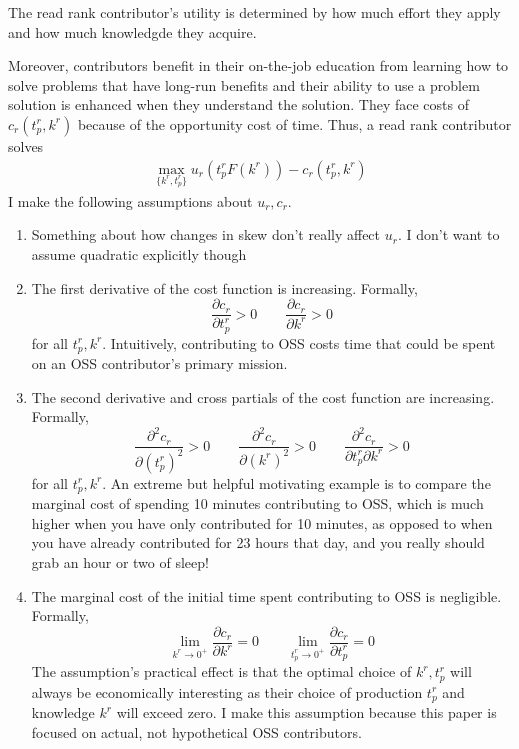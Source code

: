 \documentclass[source/paper/main.tex]{subfiles}
\begin{document}
\qquad The read rank contributor's utility is determined by how much effort they apply and how much knowledgde they acquire. 

Moreover, contributors benefit in their on-the-job education from learning how to solve problems that have long-run benefits and their ability to use a problem solution is enhanced when they understand the solution. They face costs of $c_r(t_p^r, k^r)$ because of the opportunity cost of time. Thus, a read rank contributor solves 
\begin{align}
    \max_{\{k^r, t_p^r\}} u_r\left( t_p^rF(k^r)  \right) - c_r(t_p^r, k^r) \label{read_rank_problem}
\end{align}
I make the following assumptions about $u_r, c_r$. 
\begin{enumerate}
    \item Something about how changes in skew don't really affect $u_r$. I don't want to assume quadratic explicitly though

    
    \item The first derivative of the cost function is increasing. Formally, 
    $$\frac{\partial c_r}{\partial t_p^r}>0 \qquad \frac{\partial c_r}{\partial k^r}>0$$
    for all $t_p^r, k^r$. Intuitively, contributing to OSS costs time that could be spent on an OSS contributor's primary mission. 
    \item The second derivative and cross partials of the cost function are increasing. Formally, $$\frac{\partial^2 c_r}{\partial (t_p^r)^2}>0 \qquad \frac{\partial^2 c_r}{\partial (k^r)^2}>0 \qquad \frac{\partial^2 c_r}{\partial t_p^r \partial k^r}>0$$
    for all $t_p^r, k^r$. An extreme but helpful motivating example is to compare the marginal cost of spending 10 minutes contributing to OSS, which is much higher when you have only contributed for 10 minutes, as opposed to when you have already contributed for 23 hours that day, and you really should grab an hour or two of sleep! 
    \item The marginal cost of the initial time spent contributing to OSS is negligible. Formally, $$\lim_{k^r \to 0^+} \frac{\partial c_r}{\partial k^r} = 0 \qquad  \lim_{t_p^r \to 0^+} \frac{\partial c_r}{\partial t_p^r} = 0$$
    The assumption's practical effect is that the optimal choice of $k^r, t_p^r$ will always be economically interesting as their choice of production $t_p^r$ and knowledge $k^r$ will exceed zero. I make this assumption because this paper is focused on actual, not hypothetical OSS contributors.
\end{enumerate}
\end{document}
